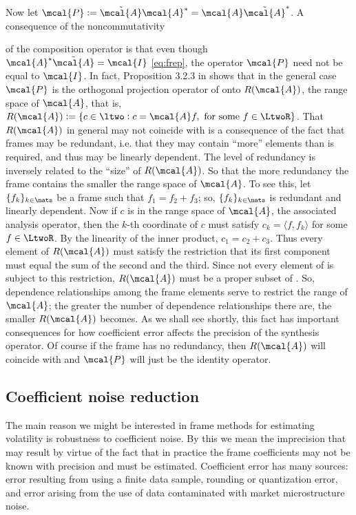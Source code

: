 \documentclass[a4paper, 12pt]{article}
\newcommand{\inner}[2]{\ensuremath{\langle{#1},{#2}\rangle}\xspace}
\newcommand{\ap}{\ensuremath{\mcal{A}}\xspace}
\begin{document}
Now let $\mcal{P}:= \tilde{\mcal{A}}\mcal{A}^*  = \mcal{A}\tilde{\mcal{A}}^*$. A consequence of the noncommutativity\begin{comment}\footnote{A binary operation $\star$ is noncommutative if $A\star B$ is generally not equal to $B\star A$. A classic  example is matrix multiplication.}\end{comment} of the composition operator is that even though $\mcal{A}^*\tilde{\mcal{A}} = \mcal{I}$  \eqref{eq:frep}, the operator $\mcal{P}$   need not be equal to $\mcal{I}$. In fact, Proposition 3.2.3 in \citep{Daubechies1992} shows that in the general case $\mcal{P}$ is the orthogonal projection operator of \ltwo onto $R(\ap)$, the range space of $\mcal{A}$, that is, {$R(\mcal{A}) := \{c \in \ltwo : c = \mcal{A} f, \text{ for some } f \in \LtwoR\}$}.   That $R(\mcal{A})$ in general may not coincide  with \ltwo is a consequence of the fact that  frames  may be redundant, i.e.  that they may contain ``more'' elements than is required, and thus may be linearly dependent. The level of redundancy is inversely related to the ``size'' of  $R(\mcal{A})$. So that the more redundancy the frame contains the smaller the range space of \ap. To see this, let $\{f_k\}_{k \in \nats}$ be a  frame  such that $f_1 = f_2 + f_3$; so, $\{f_k\}_{k \in \nats}$ is redundant and  linearly dependent. Now if $c$ is in the range space of \ap, the associated analysis operator, then  the $k$-th coordinate of $c$ must satisfy $c_k = \inner{f}{f_k}$  for some $f \in \LtwoR$.  By the linearity of the inner product, $c_1 = c_2 + c_3$. Thus every element of $R(\ap)$ must satisfy the restriction that its first component must equal the sum of the second and the third. Since not every element of  \ltwo is subject to this restriction, $R(\ap)$ must be a proper subset of \ltwo. So, dependence relationships among the frame elements serve to restrict the range of \ap; the greater the number of dependence relationships there are, the smaller $R(\ap)$ becomes.   As we shall see shortly, this fact has important consequences for how coefficient error affects the precision of the synthesis operator. Of course if the frame has no redundancy, then $R(\mcal{A})$   will coincide with \ltwo and $\mcal{P}$ will just be the identity operator. 
\subsection{Coefficient noise reduction}\label{sub:why}
The main reason we might be interested in frame methods for estimating volatility is robustness to coefficient noise. By this we mean the imprecision that may result by virtue of the fact that in practice the frame coefficients may not be known with precision and must be estimated. Coefficient error has many sources: error resulting from using a finite data sample, rounding or quantization error,  and error arising from the use of data contaminated with market microstructure noise. 
\end{document}
